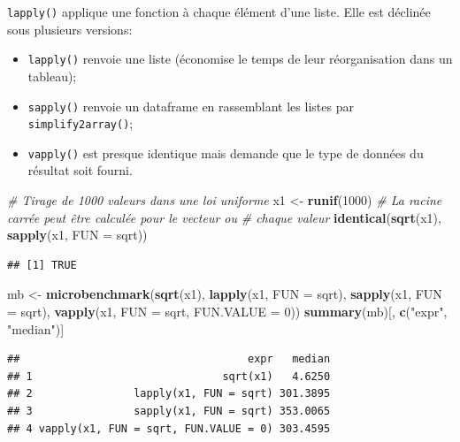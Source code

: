 \documentclass[
  12pt,
  french,
  a4paper,
  extrafontsizes,onecolumn,openright
  ]{memoir}
\newenvironment{Shaded}{\begin{snugshade}}{\end{snugshade}}
\newcommand{\CommentTok}[1]{\textcolor[rgb]{0.56,0.35,0.01}{\textit{#1}}}
\newcommand{\DataTypeTok}[1]{\textcolor[rgb]{0.13,0.29,0.53}{#1}}
\newcommand{\DecValTok}[1]{\textcolor[rgb]{0.00,0.00,0.81}{#1}}
\newcommand{\KeywordTok}[1]{\textcolor[rgb]{0.13,0.29,0.53}{\textbf{#1}}}
\newcommand{\NormalTok}[1]{#1}
\newcommand{\StringTok}[1]{\textcolor[rgb]{0.31,0.60,0.02}{#1}}
\providecommand{\tightlist}{%
  \setlength{\itemsep}{0pt}\setlength{\parskip}{0pt}}
\begin{document}
\texttt{lapply()} applique une fonction à chaque élément d'une liste.
Elle est déclinée sous plusieurs versions:

\begin{itemize}
\tightlist
\item
  \texttt{lapply()} renvoie une liste (économise le temps de leur réorganisation dans un tableau);
\item
  \texttt{sapply()} renvoie un dataframe en rassemblant les listes par \texttt{simplify2array()};
\item
  \texttt{vapply()} est presque identique mais demande que le type de données du résultat soit fourni.
\end{itemize}

\scriptsize

\begin{Shaded}
\begin{Highlighting}[]
\CommentTok{# Tirage de 1000 valeurs dans une loi uniforme}
\NormalTok{x1 <-}\StringTok{ }\KeywordTok{runif}\NormalTok{(}\DecValTok{1000}\NormalTok{)}
\CommentTok{# La racine carrée peut être calculée pour le vecteur ou}
\CommentTok{# chaque valeur}
\KeywordTok{identical}\NormalTok{(}\KeywordTok{sqrt}\NormalTok{(x1), }\KeywordTok{sapply}\NormalTok{(x1, }\DataTypeTok{FUN =}\NormalTok{ sqrt))}
\end{Highlighting}
\end{Shaded}

\begin{verbatim}
## [1] TRUE
\end{verbatim}

\begin{Shaded}
\begin{Highlighting}[]
\NormalTok{mb <-}\StringTok{ }\KeywordTok{microbenchmark}\NormalTok{(}\KeywordTok{sqrt}\NormalTok{(x1), }\KeywordTok{lapply}\NormalTok{(x1, }\DataTypeTok{FUN =}\NormalTok{ sqrt), }\KeywordTok{sapply}\NormalTok{(x1, }
    \DataTypeTok{FUN =}\NormalTok{ sqrt), }\KeywordTok{vapply}\NormalTok{(x1, }\DataTypeTok{FUN =}\NormalTok{ sqrt, }\DataTypeTok{FUN.VALUE =} \DecValTok{0}\NormalTok{))}
\KeywordTok{summary}\NormalTok{(mb)[, }\KeywordTok{c}\NormalTok{(}\StringTok{"expr"}\NormalTok{, }\StringTok{"median"}\NormalTok{)]}
\end{Highlighting}
\end{Shaded}

\begin{verbatim}
##                                    expr   median
## 1                              sqrt(x1)   4.6250
## 2                lapply(x1, FUN = sqrt) 301.3895
## 3                sapply(x1, FUN = sqrt) 353.0065
## 4 vapply(x1, FUN = sqrt, FUN.VALUE = 0) 303.4595
\end{verbatim}
\end{document}
